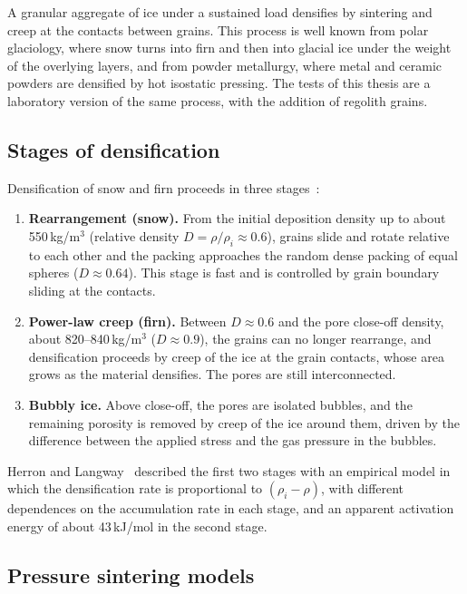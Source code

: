 A granular aggregate of ice under a sustained load densifies by sintering and creep at the contacts between grains. This process is well known from polar glaciology, where snow turns into firn and then into glacial ice under the weight of the overlying layers, and from powder metallurgy, where metal and ceramic powders are densified by hot isostatic pressing. The tests of this thesis are a laboratory version of the same process, with the addition of regolith grains.

\subsection{Stages of densification}

Densification of snow and firn proceeds in three stages~\cite{herron1980,arnaud2000}:
\begin{enumerate}
    \item \textbf{Rearrangement (snow).} From the initial deposition density up to about 550\,kg/m$^3$ (relative density $D = \rho/\rho_i\approx0.6$), grains slide and rotate relative to each other and the packing approaches the random dense packing of equal spheres ($D\approx0.64$). This stage is fast and is controlled by grain boundary sliding at the contacts.
    \item \textbf{Power-law creep (firn).} Between $D\approx0.6$ and the pore close-off density, about 820--840\,kg/m$^3$ ($D\approx0.9$), the grains can no longer rearrange, and densification proceeds by creep of the ice at the grain contacts, whose area grows as the material densifies. The pores are still interconnected.
    \item \textbf{Bubbly ice.} Above close-off, the pores are isolated bubbles, and the remaining porosity is removed by creep of the ice around them, driven by the difference between the applied stress and the gas pressure in the bubbles.
\end{enumerate}
Herron and Langway~\cite{herron1980} described the first two stages with an empirical model in which the densification rate is proportional to $(\rho_i - \rho)$, with different dependences on the accumulation rate in each stage, and an apparent activation energy of about 43\,kJ/mol in the second stage.

\subsection{Pressure sintering models}


